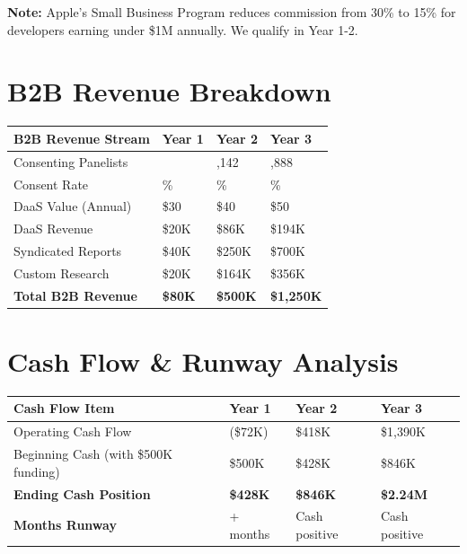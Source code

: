 \documentclass[11pt,a4paper]{report}
\begin{document}
\textbf{Note:} Apple's Small Business Program reduces commission from 30\% to 15\% for developers earning under \$1M annually. We qualify in Year 1-2.

\section{B2B Revenue Breakdown}

\begin{center}
\renewcommand{\arraystretch}{1.4}
\begin{tabular}{>{\raggedright\arraybackslash}p{4cm} >{\centering\arraybackslash}p{2.5cm} >{\centering\arraybackslash}p{2.5cm} >{\centering\arraybackslash}p{2.5cm}}
\toprule
\rowcolor{datapurple!15}
\textbf{B2B Revenue Stream} & \textbf{Year 1} & \textbf{Year 2} & \textbf{Year 3} \\
\midrule
Consenting Panelists & 675 & 2,142 & 3,888 \\
\rowcolor{lightbg}
Consent Rate & 40\% & 40\% & 40\% \\
DaaS Value (Annual) & \$30 & \$40 & \$50 \\
\rowcolor{lightbg}
DaaS Revenue & \$20K & \$86K & \$194K \\
Syndicated Reports & \$40K & \$250K & \$700K \\
\rowcolor{lightbg}
Custom Research & \$20K & \$164K & \$356K \\
\midrule
\rowcolor{successgreen!10}
\textbf{Total B2B Revenue} & \textbf{\$80K} & \textbf{\$500K} & \textbf{\$1,250K} \\
\bottomrule
\end{tabular}
\end{center}

\section{Cash Flow \& Runway Analysis}

\begin{center}
\renewcommand{\arraystretch}{1.4}
\begin{tabular}{>{\raggedright\arraybackslash}p{5cm} >{\centering\arraybackslash}p{3cm} >{\centering\arraybackslash}p{3cm} >{\centering\arraybackslash}p{3cm}}
\toprule
\rowcolor{miloprimary!15}
\textbf{Cash Flow Item} & \textbf{Year 1} & \textbf{Year 2} & \textbf{Year 3} \\
\midrule
Operating Cash Flow & (\$72K) & \$418K & \$1,390K \\
\rowcolor{lightbg}
Beginning Cash (with \$500K funding) & \$500K & \$428K & \$846K \\
\textbf{Ending Cash Position} & \textbf{\$428K} & \textbf{\$846K} & \textbf{\$2.24M} \\
\rowcolor{successgreen!10}
\textbf{Months Runway} & 18+ months & Cash positive & Cash positive \\
\bottomrule
\end{tabular}
\end{center}
\end{document}
